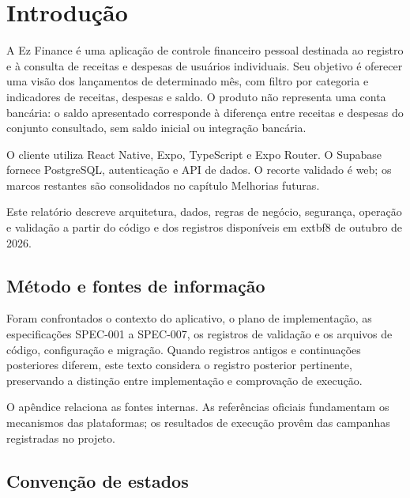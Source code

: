 \documentclass[
    12pt,
    oneside,
    a4paper,
    brazil
]{abntex2}
\begin{document}
\tableofcontents*
\cleardoublepage

\textual

\chapter{Introdução}

A Ez Finance é uma aplicação de controle financeiro pessoal destinada ao registro e à consulta de receitas e despesas de usuários individuais. Seu objetivo é oferecer uma visão dos lançamentos de determinado mês, com filtro por categoria e indicadores de receitas, despesas e saldo. O produto não representa uma conta bancária: o saldo apresentado corresponde à diferença entre receitas e despesas do conjunto consultado, sem saldo inicial ou integração bancária.

O cliente utiliza React Native, Expo, TypeScript e Expo Router. O Supabase fornece PostgreSQL, autenticação e API de dados. O recorte validado é web; os marcos restantes são consolidados no capítulo Melhorias futuras.

Este relatório descreve arquitetura, dados, regras de negócio, segurança, operação e validação a partir do código e dos registros disponíveis em 	extbf{8 de outubro de 2026}.

\section{Método e fontes de informação}

Foram confrontados o contexto do aplicativo, o plano de implementação, as especificações SPEC-001 a SPEC-007, os registros de validação e os arquivos de código, configuração e migração. Quando registros antigos e continuações posteriores diferem, este texto considera o registro posterior pertinente, preservando a distinção entre implementação e comprovação de execução.

O apêndice relaciona as fontes internas. As referências oficiais fundamentam os mecanismos das plataformas; os resultados de execução provêm das campanhas registradas no projeto.

\section{Convenção de estados}
\end{document}
